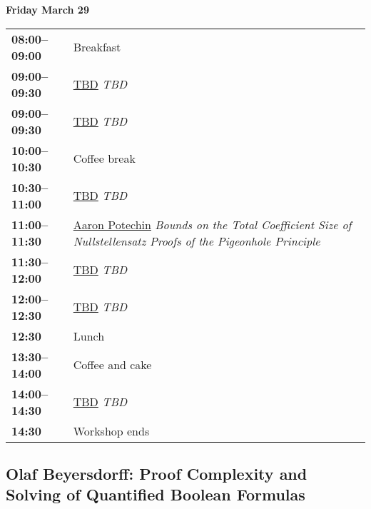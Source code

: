 \documentclass[11pt]{article}
\newcommand{\scheduletablewidth}{5.06in}
\begin{document}
\noindent\begin{minipage}{\textwidth}
\begin{center} {\bf\large Friday March 29} \end{center}
\begin{tabular}{ p{0.9in} p{\scheduletablewidth} }

{\bf 08:00--09:00}  & Breakfast\\

{\bf 09:00--09:30} & \hyperref[TBDFri900]{TBD}
{\em TBD} \\

{\bf 09:00--09:30} & \hyperref[TBDFri930]{TBD}
{\em TBD} \\

{\bf 10:00--10:30} & {Coffee break} \\

{\bf 10:30--11:00} & \hyperref[TBDFri1030]{TBD}
{\em TBD} \\

{\bf 11:00--11:30} & \hyperref[Potechin]{Aaron Potechin}
{\em Bounds on the Total Coefficient Size of Nullstellensatz Proofs of the Pigeonhole Principle} \\

{\bf 11:30--12:00} & \hyperref[TBDFri1130]{TBD}
{\em TBD} \\

{\bf 12:00--12:30} & \hyperref[TBDFri1200]{TBD}
{\em TBD} \\



{\bf 12:30%
} &  Lunch\\

{\bf 13:30--14:00} &  Coffee and cake \\

{\bf 14:00--14:30} & \hyperref[TBDFri1400]{TBD}
{\em TBD} \\

{\bf 14:30%
} & Workshop ends \\
\end{tabular}
\end{minipage}


\pagebreak

\subsection*{Olaf Beyersdorff: Proof Complexity and Solving of Quantified Boolean Formulas}\label{Beyersdorff}
\end{document}
